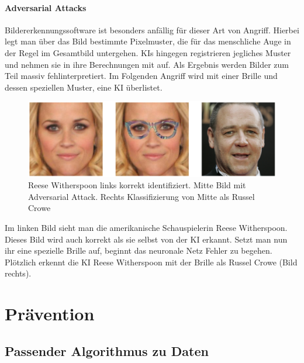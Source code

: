 \documentclass[12pt,oneside,a4paper,parskip]{scrbook}
\begin{document}
\subsubsection{Adversarial Attacks}
Bildererkennungssoftware ist besonders anfällig für dieser Art von Angriff. Hierbei legt man über das Bild bestimmte Pixelmuster, die für das menschliche Auge in der Regel im Gesamtbild untergehen. KIs hingegen registrieren jegliches Muster und nehmen sie in ihre Berechnungen mit auf. Als Ergebnis werden Bilder zum Teil massiv fehlinterpretiert.
Im Folgenden Angriff wird mit einer Brille und dessen speziellen Muster, eine KI überlistet.
\label{section:BrilleAttack}
\begin{figure}[h]
	\begin{center}
		\includegraphics[width=15cm]{Bilder/Brille_Adversarial_Attack.png}
		\caption{Reese Witherspoon links korrekt identifiziert. Mitte Bild mit Adversarial Attack. Rechts Klassifizierung von Mitte als Russel Crowe}
		\label{fig:BrilleAttack}
	\end{center}
\end{figure}
Im linken Bild sieht man die amerikanische Schauspielerin Reese Witherspoon. Dieses Bild wird auch korrekt als sie selbst von der KI erkannt. Setzt man nun ihr eine spezielle Brille auf, beginnt das neuronale Netz Fehler zu begehen. Plötzlich erkennt die KI Reese Witherspoon mit der Brille als Russel Crowe (Bild rechts).

\chapter{Prävention}
\label{chapter:main}
\section{Passender Algorithmus zu Daten}
\end{document}
